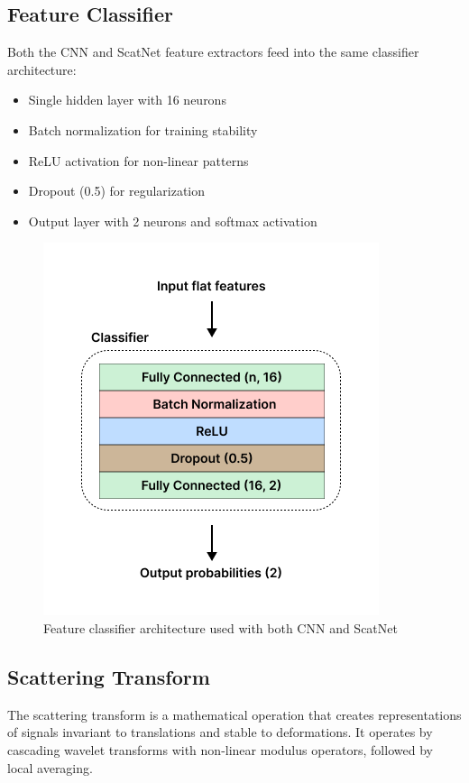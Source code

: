\documentclass[10pt,twocolumn]{article}
\begin{document}
\subsection{Feature Classifier}
Both the CNN and ScatNet feature extractors feed into the same classifier architecture:
\begin{itemize}
    \item Single hidden layer with 16 neurons
    \item Batch normalization for training stability
    \item ReLU activation for non-linear patterns
    \item Dropout (0.5) for regularization
    \item Output layer with 2 neurons and softmax activation
\end{itemize}

\begin{figure}[h]
\centering
\includegraphics[width=0.8\columnwidth]{imgs/classifier_arch.png}
\caption{Feature classifier architecture used with both CNN and ScatNet}
\label{fig:classifier_arch}
\end{figure}

\subsection{Scattering Transform}
The scattering transform is a mathematical operation that creates representations of signals invariant to translations and stable to deformations. It operates by cascading wavelet transforms with non-linear modulus operators, followed by local averaging.
\end{document}
